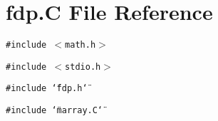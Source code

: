 \section{fdp.C File Reference}
\label{fdp_8C}
{\tt \#include $<$math.h$>$}\par
{\tt \#include $<$stdio.h$>$}\par
{\tt \#include \char`\"{}fdp.h\char`\"{}}\par
{\tt \#include \char`\"{}marray.C\char`\"{}}\par
